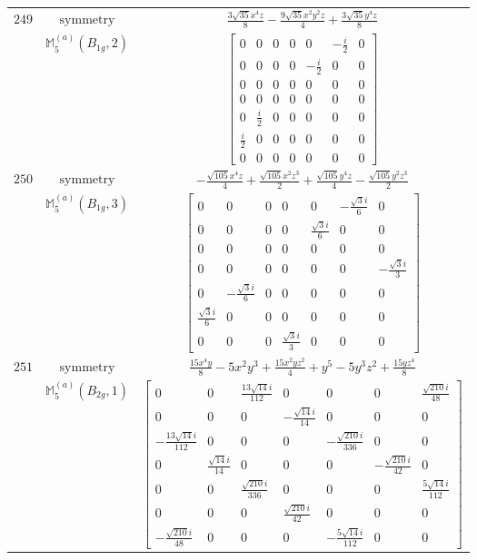 \documentclass[fleqn,8pt,landscape]{jsarticle}
\begin{document}
\begin{longtable}{ccc}
$ 249 $ & $ \text{symmetry} $ & $ \frac{3 \sqrt{35} x^{4} z}{8} - \frac{9 \sqrt{35} x^{2} y^{2} z}{4} + \frac{3 \sqrt{35} y^{4} z}{8} $ \\
$  $ & $ \mathbb{M}_{5}^{(a)}(B_{1g},2) $ & $ \begin{bmatrix} 0 & 0 & 0 & 0 & 0 & - \frac{i}{2} & 0 \\ 0 & 0 & 0 & 0 & - \frac{i}{2} & 0 & 0 \\ 0 & 0 & 0 & 0 & 0 & 0 & 0 \\ 0 & 0 & 0 & 0 & 0 & 0 & 0 \\ 0 & \frac{i}{2} & 0 & 0 & 0 & 0 & 0 \\ \frac{i}{2} & 0 & 0 & 0 & 0 & 0 & 0 \\ 0 & 0 & 0 & 0 & 0 & 0 & 0 \end{bmatrix} $ \\ \hline
$ 250 $ & $ \text{symmetry} $ & $ - \frac{\sqrt{105} x^{4} z}{4} + \frac{\sqrt{105} x^{2} z^{3}}{2} + \frac{\sqrt{105} y^{4} z}{4} - \frac{\sqrt{105} y^{2} z^{3}}{2} $ \\
$  $ & $ \mathbb{M}_{5}^{(a)}(B_{1g},3) $ & $ \begin{bmatrix} 0 & 0 & 0 & 0 & 0 & - \frac{\sqrt{3} i}{6} & 0 \\ 0 & 0 & 0 & 0 & \frac{\sqrt{3} i}{6} & 0 & 0 \\ 0 & 0 & 0 & 0 & 0 & 0 & 0 \\ 0 & 0 & 0 & 0 & 0 & 0 & - \frac{\sqrt{3} i}{3} \\ 0 & - \frac{\sqrt{3} i}{6} & 0 & 0 & 0 & 0 & 0 \\ \frac{\sqrt{3} i}{6} & 0 & 0 & 0 & 0 & 0 & 0 \\ 0 & 0 & 0 & \frac{\sqrt{3} i}{3} & 0 & 0 & 0 \end{bmatrix} $ \\ \hline
$ 251 $ & $ \text{symmetry} $ & $ \frac{15 x^{4} y}{8} - 5 x^{2} y^{3} + \frac{15 x^{2} y z^{2}}{4} + y^{5} - 5 y^{3} z^{2} + \frac{15 y z^{4}}{8} $ \\
$  $ & $ \mathbb{M}_{5}^{(a)}(B_{2g},1) $ & $ \begin{bmatrix} 0 & 0 & \frac{13 \sqrt{14} i}{112} & 0 & 0 & 0 & \frac{\sqrt{210} i}{48} \\ 0 & 0 & 0 & - \frac{\sqrt{14} i}{14} & 0 & 0 & 0 \\ - \frac{13 \sqrt{14} i}{112} & 0 & 0 & 0 & - \frac{\sqrt{210} i}{336} & 0 & 0 \\ 0 & \frac{\sqrt{14} i}{14} & 0 & 0 & 0 & - \frac{\sqrt{210} i}{42} & 0 \\ 0 & 0 & \frac{\sqrt{210} i}{336} & 0 & 0 & 0 & \frac{5 \sqrt{14} i}{112} \\ 0 & 0 & 0 & \frac{\sqrt{210} i}{42} & 0 & 0 & 0 \\ - \frac{\sqrt{210} i}{48} & 0 & 0 & 0 & - \frac{5 \sqrt{14} i}{112} & 0 & 0 \end{bmatrix} $ \\ \hline

\end{longtable}
\end{document}
